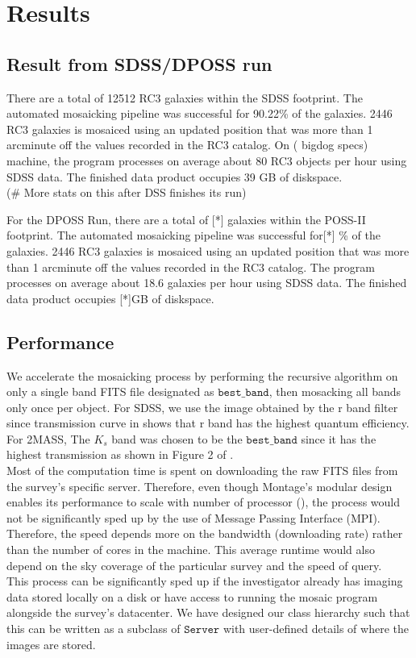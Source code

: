 \documentclass[5p]{elsarticle}
\begin{document}
\section{Results}
\subsection{Result from SDSS/DPOSS run}
\indent There are a total of 12512 RC3 galaxies within the SDSS footprint. The automated mosaicking pipeline was  successful for 90.22\% of the galaxies. 2446 RC3 galaxies is mosaiced using an updated position that was more than 1 arcminute off the values recorded in the RC3 catalog.  On ( bigdog specs)  machine, the program processes on average about 80 RC3 objects per hour using SDSS data.  %
The finished data product occupies 39 GB of diskspace. 
\\
\indent  (\# More stats on this after DSS finishes its run) 
 
 For the DPOSS Run, there are a total of [*] galaxies within the POSS-II footprint.
 The automated mosaicking pipeline was  successful for[*] \% of the galaxies. 2446 RC3 galaxies is mosaiced using an updated position that was more than 1 arcminute off the values recorded in the RC3 catalog. The program processes on average about 18.6 galaxies per hour using SDSS data.  %
The finished data product occupies [*]GB of diskspace. 

	\subsection{Performance}	
	\indent We accelerate the mosaicking process by performing the recursive algorithm on only a single band FITS file designated as $\texttt{best\_band}$, then mosacking all bands only once per object. For SDSS, we use the image obtained by the r band filter since transmission curve in \citet{edr} shows that r band has the highest quantum efficiency.	 For 2MASS, The $K_s$ band was chosen to be the $\texttt{best\_band}$ since it has the highest transmission as shown  in Figure 2 of \citet{2mass}.
	\\
	 \indent  Most of the computation time is spent on downloading the raw FITS files from the survey's specific server. Therefore, even though Montage's modular design enables its performance to scale with number of processor  (\citet{montage}), the process would not be significantly sped up by the use of Message Passing Interface (MPI). Therefore, the speed depends more on the bandwidth (downloading rate) rather than the number of cores in the machine. This average runtime would also depend on the sky coverage of the  particular survey and the speed of query.
	\\ \indent This process can  be significantly sped up if the investigator already has imaging data stored locally on a disk or have access to running the mosaic program alongside the survey's datacenter. We have designed our class hierarchy such that this can be written as a subclass of $\texttt{Server}$ with user-defined details of where the images are stored.
\end{document}
